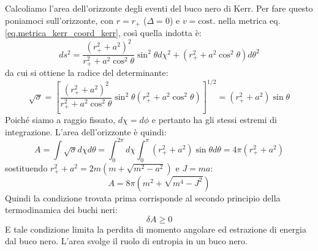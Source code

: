 Calcoliamo l'area dell'orizzonte degli eventi del buco nero di Kerr. Per fare questo poniamoci sull'orizzonte, con $r= r_+$ ($\Delta = 0$) e $v = \textrm{cost.}$ nella metrica eq. \ref{eq.metrica_kerr_coord_kerr}, così quella indotta è:
\begin{equation*}
    ds^2 = \frac{(r^2_+ + a^2)^2}{r^2_+ + a^2\cos^2\theta}\sin^2\theta d\chi^2 + (r^2_+ + a^2\cos^2\theta)d\theta^2
\end{equation*}
da cui si ottiene la radice del determinante:
\begin{equation*}
    \sqrt{\sigma} = \left[ \frac{(r^2_+ + a^2)^2}{r^2_+ + a^2\cos^2\theta}\sin^2\theta(r^2_+ + a^2\cos^2\theta)  \right]^{1/2} = (r^2_+ + a^2)\sin\theta
\end{equation*}
Poiché siamo a raggio fissato, $d\chi = d\phi$ e pertanto ha gli stessi estremi di integrazione. L'area dell'orizzonte è quindi:
\begin{equation}
    A = \int \sqrt{\sigma}d\chi d\theta = \int_0^{2\pi}d\chi \int_0^\pi (r^2_+ + a^2)\sin\theta d\theta = 4\pi (r_+^2 + a^2)
    \label{eq.area_orizz_kerr}
\end{equation}
sostituendo $r^2_+ + a^2 = 2m(m+\sqrt{m^2 - a^2})$ e $J=ma$:
\begin{equation*}
    A = 8\pi\left( m^2 +\sqrt{m^4 - J^2}\right)
\end{equation*}
Quindi la condizione trovata prima corrisponde al secondo principio della termodinamica dei buchi neri:
\begin{equation*}
    \delta A \geq 0
\end{equation*}
E tale condizione limita la perdita di momento angolare ed estrazione di energia dal buco nero. L'area svolge il ruolo di entropia in un buco nero.

